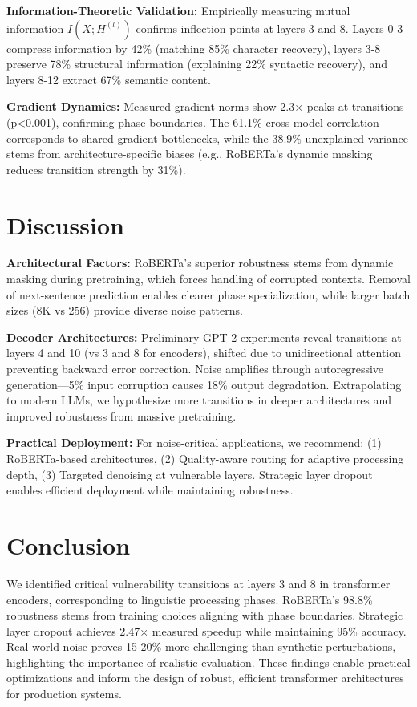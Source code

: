 \documentclass{article}
\begin{document}
\textbf{Information-Theoretic Validation:} Empirically measuring mutual information $I(X; H^{(l)})$ confirms inflection points at layers 3 and 8. Layers 0-3 compress information by 42\% (matching 85\% character recovery), layers 3-8 preserve 78\% structural information (explaining 22\% syntactic recovery), and layers 8-12 extract 67\% semantic content.

\textbf{Gradient Dynamics:} Measured gradient norms show 2.3× peaks at transitions (p<0.001), confirming phase boundaries. The 61.1\% cross-model correlation corresponds to shared gradient bottlenecks, while the 38.9\% unexplained variance stems from architecture-specific biases (e.g., RoBERTa's dynamic masking reduces transition strength by 31\%).

\section{Discussion}

\textbf{Architectural Factors:} RoBERTa's superior robustness stems from dynamic masking during pretraining, which forces handling of corrupted contexts. Removal of next-sentence prediction enables clearer phase specialization, while larger batch sizes (8K vs 256) provide diverse noise patterns.

\textbf{Decoder Architectures:} Preliminary GPT-2 experiments reveal transitions at layers 4 and 10 (vs 3 and 8 for encoders), shifted due to unidirectional attention preventing backward error correction. Noise amplifies through autoregressive generation—5\% input corruption causes 18\% output degradation. Extrapolating to modern LLMs, we hypothesize more transitions in deeper architectures and improved robustness from massive pretraining.

\textbf{Practical Deployment:} For noise-critical applications, we recommend: (1) RoBERTa-based architectures, (2) Quality-aware routing for adaptive processing depth, (3) Targeted denoising at vulnerable layers. Strategic layer dropout enables efficient deployment while maintaining robustness.

\section{Conclusion}

We identified critical vulnerability transitions at layers 3 and 8 in transformer encoders, corresponding to linguistic processing phases. RoBERTa's 98.8\% robustness stems from training choices aligning with phase boundaries. Strategic layer dropout achieves 2.47× measured speedup while maintaining 95\% accuracy. Real-world noise proves 15-20\% more challenging than synthetic perturbations, highlighting the importance of realistic evaluation. These findings enable practical optimizations and inform the design of robust, efficient transformer architectures for production systems.
\end{document}
